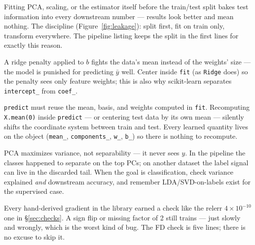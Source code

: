 \begin{tripwire}
Fitting PCA, scaling, or the estimator itself before the train/test
split bakes test information into every downstream number ---
results look better and mean nothing. The discipline
(Figure~\ref{fig:leakage}): split first, fit on train only,
transform everywhere. The pipeline listing keeps the split in the
first lines for exactly this reason.
\end{tripwire}

\begin{tripwire}
A ridge penalty applied to $b$ fights the data's mean instead of the
weights' size --- the model is punished for predicting
$\bar y$ well. Center inside \texttt{fit} (as \texttt{Ridge} does)
so the penalty sees only feature weights; this is also why
scikit-learn separates \texttt{intercept\_} from \texttt{coef\_}.
\end{tripwire}

\begin{tripwire}
\texttt{predict} must reuse the mean, basis, and weights computed in
\texttt{fit}. Recomputing \texttt{X.mean(0)} inside
\texttt{predict} --- or centering test data by its own mean ---
silently shifts the coordinate system between train and test. Every
learned quantity lives on the object (\texttt{mean\_},
\texttt{components\_}, \texttt{w\_}, \texttt{b\_}) so there is
nothing to recompute.
\end{tripwire}

\begin{tripwire}
PCA maximizes variance, not separability --- it never sees $y$. In
the pipeline the classes happened to separate on the top PCs; on
another dataset the label signal can live in the discarded tail.
When the goal is classification, check variance explained
\emph{and} downstream accuracy, and remember LDA/SVD-on-labels exist
for the supervised case.
\end{tripwire}

\begin{tripwire}
Every hand-derived gradient in the library earned a check like the
relerr $4\times10^{-10}$ one in \S\ref{sec:checks}. A sign flip or
missing factor of 2 still trains --- just slowly and wrongly, which
is the worst kind of bug. The FD check is five lines; there is no
excuse to skip it.
\end{tripwire}

